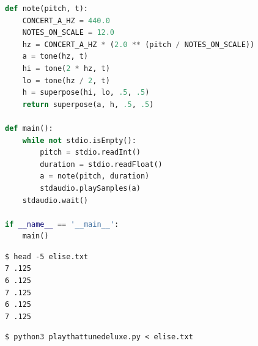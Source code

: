 \documentclass[8pt,a4paper,compress]{beamer}
\begin{document}
\begin{frame}[fragile]
\pause

\begin{lstlisting}[language=Python,style=focusin]
def note(pitch, t):
    CONCERT_A_HZ = 440.0
    NOTES_ON_SCALE = 12.0
    hz = CONCERT_A_HZ * (2.0 ** (pitch / NOTES_ON_SCALE))
    a = tone(hz, t)
    hi = tone(2 * hz, t)
    lo = tone(hz / 2, t)
    h = superpose(hi, lo, .5, .5)
    return superpose(a, h, .5, .5)

def main():
    while not stdio.isEmpty():
        pitch = stdio.readInt()
        duration = stdio.readFloat()
        a = note(pitch, duration)
        stdaudio.playSamples(a)
    stdaudio.wait()

if __name__ == '__main__':
    main()
\end{lstlisting}

\pause\smallskip

\begin{minipage}{170pt}
\begin{lstlisting}[language={},style=focusin]
$ head -5 elise.txt
7 .125 
6 .125 
7 .125 
6 .125 
7 .125 
\end{lstlisting}

\pause\smallskip

\begin{lstlisting}[language={},style=focusin]
$ python3 playthattunedeluxe.py < elise.txt
\end{lstlisting}
\end{minipage}%
\begin{minipage}{130pt}
\hfill {}
\end{minipage}
\end{frame}
\end{document}
